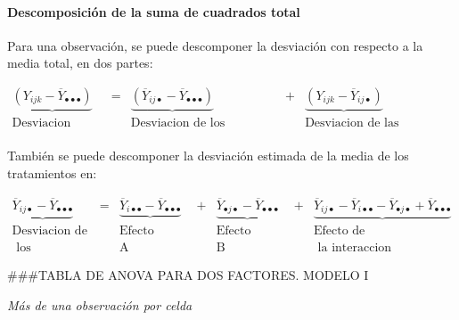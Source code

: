 \documentclass[]{book}
\let\oldparagraph\paragraph
\renewcommand{\paragraph}[1]{\oldparagraph{#1}\mbox{}}
\theoremstyle{definition}
\theoremstyle{definition}
\theoremstyle{definition}
\theoremstyle{remark}
\begin{document}
\hypertarget{descomposicion-de-la-suma-de-cuadrados-total}{%
\paragraph{Descomposición de la suma de cuadrados
total}\label{descomposicion-de-la-suma-de-cuadrados-total}}

Para una observación, se puede descomponer la desviación con respecto a
la media total, en dos partes:

\[
\begin{matrix}
\underbrace{\left ( Y_{ijk}-\overline{Y}_{\bullet\bullet\bullet} \right )} & = & \underbrace{\left ( \overline{Y}_{ij\bullet}-\overline{Y}_{\bullet\bullet\bullet} \right )}& + & \underbrace{\left ( Y_{ijk}-\overline{Y}_{ij\bullet} \right )}\\
\text{Desviacion Total} & & \text{Desviacion de los tratamientos} & & \text{Desviacion de las observaciones}  \\
\end{matrix}
\]

También se puede descomponer la desviación estimada de la media de los
tratamientos en:

\[
\begin{matrix}
  \underbrace{\overline{Y}_{ij\bullet} - \overline{Y}_{\bullet \bullet \bullet}}& = & \underbrace{\overline{Y}_{i\bullet\bullet} - \overline{Y}_{\bullet \bullet \bullet}} & + & \underbrace{\overline{Y}_{\bullet j \bullet} - \overline{Y}_{\bullet \bullet \bullet}} & + & \underbrace{\overline{Y}_{ij \bullet} - \overline{Y}_{i \bullet \bullet} - \overline{Y}_{\bullet j \bullet} + \overline{Y}_{\bullet \bullet \bullet}} \\
\text{Desviacion de} & & \text{Efecto principal} & & \text{Efecto principal} & & \text{Efecto de}  \\
\text{ los tratamientos} & & \text{A} & & \text{B} & & \text{ la interaccion}
\end{matrix}
\]

\#\#\#TABLA DE ANOVA PARA DOS FACTORES. MODELO I

\emph{Más de una observación por celda}
\end{document}

